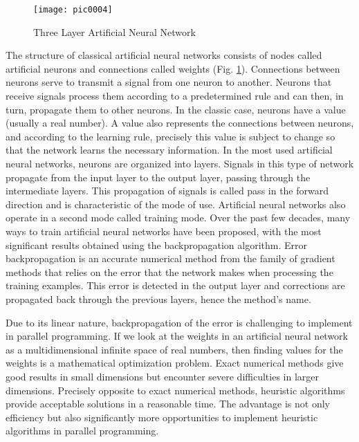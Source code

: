 \begin{figure}[h]
\centering
\texttt{[image: pic0004]}
\caption{Three Layer Artificial Neural Network}
\label{fig:pic0004}
\end{figure}

The structure of classical artificial neural networks consists of nodes called artificial neurons and connections called weights (Fig. \ref{fig:pic0004}). Connections between neurons serve to transmit a signal from one neuron to another. Neurons that receive signals process them according to a predetermined rule and can then, in turn, propagate them to other neurons. In the classic case, neurons have a value (usually a real number). A value also represents the connections between neurons, and according to the learning rule, precisely this value is subject to change so that the network learns the necessary information. In the most used artificial neural networks, neurons are organized into layers. Signals in this type of network propagate from the input layer to the output layer, passing through the intermediate layers. This propagation of signals is called pass in the forward direction and is characteristic of the mode of use. Artificial neural networks also operate in a second mode called training mode. Over the past few decades, many ways to train artificial neural networks have been proposed, with the most significant results obtained using the backpropagation algorithm. Error backpropagation is an accurate numerical method from the family of gradient methods that relies on the error that the network makes when processing the training examples. This error is detected in the output layer and corrections are propagated back through the previous layers, hence the method's name.

Due to its linear nature, backpropagation of the error is challenging to implement in parallel programming. If we look at the weights in an artificial neural network as a multidimensional infinite space of real numbers, then finding values for the weights is a mathematical optimization problem. Exact numerical methods give good results in small dimensions but encounter severe difficulties in larger dimensions. Precisely opposite to exact numerical methods, heuristic algorithms provide acceptable solutions in a reasonable time. The advantage is not only efficiency but also significantly more opportunities to implement heuristic algorithms in parallel programming.

